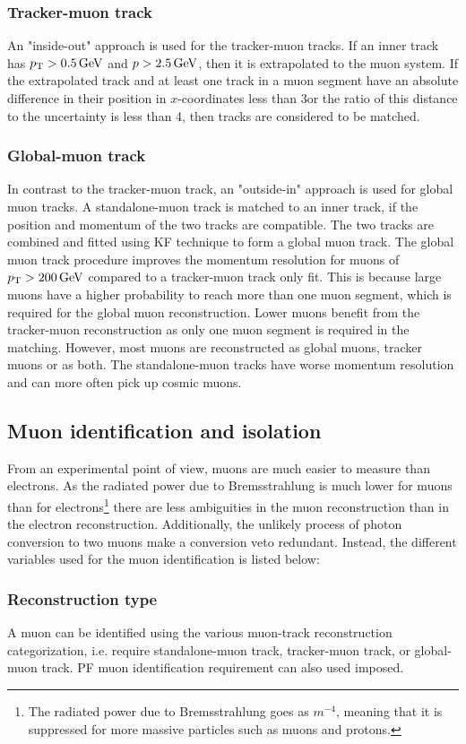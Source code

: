 \subsubsection*{Tracker-muon track}
\noindent\justify
An "inside-out" approach is used for the tracker-muon tracks. 
If an inner track has $p_{\mathrm{T}} > 0.5\,\text{Ge\hspace{-.08em}V}$ and $p > 2.5\,\text{Ge\hspace{-.08em}V}$, then it is extrapolated to the muon system. 
If the extrapolated track and at least one track in a muon segment have an absolute difference in their position in $x$-coordinates less than 3\cm or the ratio of this distance to the uncertainty is less than 4, then tracks are considered to be matched.  
\subsubsection*{Global-muon track}
\noindent\justify
In contrast to the tracker-muon track, an "outside-in" approach is used for global muon tracks. 
A standalone-muon track is matched to an inner track, if the position and momentum of the two tracks are compatible. 
The two tracks are combined and fitted using KF technique to form a global muon track. 
The global muon track procedure improves the momentum resolution for muons of $p_{\mathrm{T}} > 200\,\text{Ge\hspace{-.08em}V}$ compared to a tracker-muon track only fit. 
This is because large \pt muons have a higher probability to reach more than one muon segment, which is required for the global muon reconstruction. 
Lower \pt muons benefit from the tracker-muon reconstruction as only one muon segment is required in the matching. 
However, most muons are reconstructed as global muons, tracker muons or as both. The standalone-muon tracks have worse momentum resolution and can more often pick up cosmic muons. 
\subsection*{Muon identification and isolation}
\noindent\justify
From an experimental point of view, muons are much easier to measure than electrons. 
As the radiated power due to Bremsstrahlung is much lower for muons than for electrons\footnote{The radiated power due to Bremsstrahlung goes as $m^{-4}$, meaning that it is suppressed for more massive particles such as muons and protons.} there are less ambiguities in the muon reconstruction than in the electron reconstruction. 
Additionally, the unlikely process of photon conversion to two muons make a conversion veto redundant.   
Instead, the different variables used for the muon identification is listed below:
\subsubsection*{Reconstruction type}
\noindent\justify
 A muon can be identified using the various muon-track reconstruction categorization, i.e. require standalone-muon track, tracker-muon track, or global-muon track. 
PF muon identification requirement can also used imposed.
